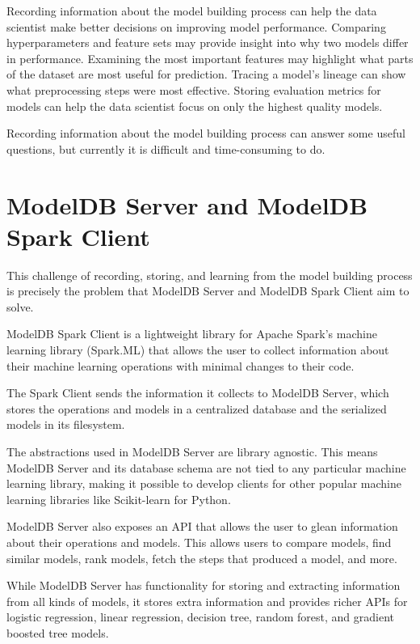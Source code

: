 Recording information about the model building process can help the data scientist 
make better decisions on improving model performance. Comparing hyperparameters
and feature sets may provide insight into why two models differ in performance. 
Examining the most important features may highlight what parts of the dataset are
most useful for prediction. Tracing a model's lineage can show what preprocessing
steps were most effective. Storing evaluation metrics for models can help
the data scientist focus on only the highest quality models. 

Recording information about the model building process can answer some useful 
questions, but currently it is difficult and time-consuming to do.

\section{ModelDB Server and ModelDB Spark Client}

This challenge of recording, storing, and learning from the model building process is precisely
the problem that ModelDB Server and ModelDB Spark Client aim to solve.

ModelDB Spark Client is a lightweight library for Apache Spark's machine learning library (Spark.ML) 
that allows the user to collect information about their machine learning operations with minimal changes to their code. 

The Spark Client sends the information it collects to ModelDB Server, which 
stores the operations and models in a centralized database and the serialized 
models in its filesystem. 

The abstractions used in ModelDB Server are library agnostic. This means ModelDB Server 
and its database schema are not tied to any particular machine learning library, making
it possible to develop clients for other popular machine learning libraries like Scikit-learn for Python.

ModelDB Server also exposes an API that allows the user to glean information about their
operations and models. This allows users to compare models, find
similar models, rank models, fetch the steps that produced a model, and more. 

While ModelDB Server has functionality for storing and extracting information from
all kinds of models, it stores extra information and provides richer APIs for 
logistic regression, linear regression, decision tree, random forest, and 
gradient boosted tree models. 

